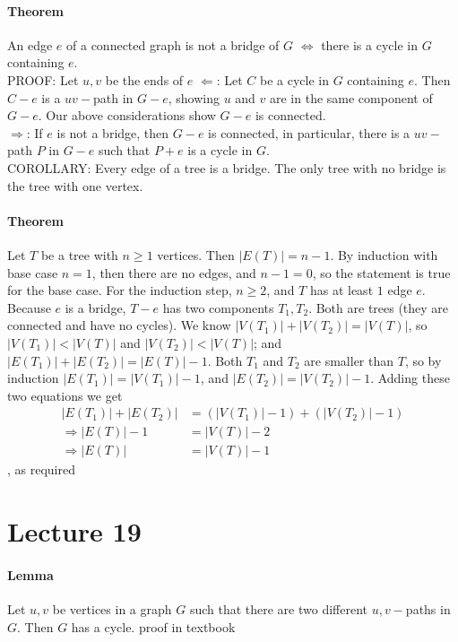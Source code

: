 \documentclass[10pt,letter]{article}
\begin{document}
\paragraph{Theorem}
An edge $e$ of a connected graph is not a bridge of $G$ $\Leftrightarrow$ there is a cycle in $G$ containing $e$. \\ 
PROOF: Let $u,v$ be the ends of $e$ 
$\Leftarrow$: Let $C$ be a cycle in $G$ containing $e$. Then $C-e$ is a $uv-$path in $G-e$, showing $u$ and $v$ are in the same component of $G-e$. Our above considerations show $G-e$ is connected. \\ 
$\Rightarrow$: If $e$ is not a bridge, then $G-e$ is connected, in particular, there is a $uv-$path $P$ in $G-e$ such that $P+e$ is a cycle in $G$. \\ 
COROLLARY: Every edge of a tree is a bridge. The only tree with no bridge is the tree with one vertex. 

\paragraph{Theorem}
Let $T$ be a tree with $n\geq1$ vertices. Then $|E(T)|=n-1$. By induction with base case $n=1$, then there are no edges, and $n-1=0$, so the statement is true for the base case. For the induction step, $n\geq2$, and $T$ has at least $1$ edge $e$. Because $e$ is a bridge, $T-e$ has two components $T_1,T_2$. Both are trees (they are connected and have no cycles). We know $|V(T_1)|+|V(T_2)|=|V(T)|$, so $|V(T_1)|<|V(T)|$ and $|V(T_2)|<|V(T)|$; and $|E(T_1)|+|E(T_2)|=|E(T)|-1$. Both $T_1$ and $T_2$ are smaller than $T$, so by induction $|E(T_1)|=|V(T_1)|-1$, and $|E(T_2)|=|V(T_2)|-1$. Adding these two equations we get \begin{align*}|E(T_1)|+|E(T_2)|&=(|V(T_1)|-1)+(|V(T_2)|-1) \\\Rightarrow |E(T)|-1&=|V(T)|-2\\\Rightarrow |E(T)|&=|V(T)|-1\end{align*}, as required

\section*{Lecture 19}
\paragraph{Lemma}
Let $u,v$ be vertices in a graph $G$ such that there are two different $u,v-$paths in $G$. Then $G$ has a cycle. proof in textbook
\end{document}
